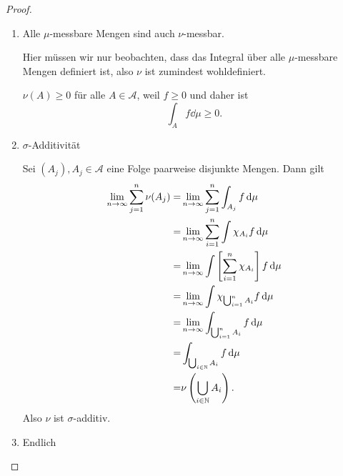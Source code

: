 \begin{proof}
	\begin{parts}
	\item 
		\begin{enumerate}[label=(\roman*)]
			\item Alle $\mu$-messbare Mengen sind auch $\nu$-messbar.

			Hier müssen wir nur beobachten, dass das Integral über alle $\mu$-messbare Mengen definiert ist, also $\nu$ ist zumindest wohldefiniert.

			$\nu(A)\ge 0$ f\"{u}r alle $A\in \mathcal{A}$, weil $f\ge 0$ und daher ist
			\[
				\int_A f\dd{\mu}\ge 0
			.\] 
		\item $\sigma$-Additivität

			Sei $(A_j), A_j\in \mathcal{A}$ eine Folge paarweise disjunkte Mengen. Dann gilt
			\begin{align*}
				\lim_{n \to \infty} \sum_{j=1}^{n} \nu(A_j)=&\lim_{n \to \infty} \sum_{j=1}^{n} \int_{A_j}f\dd{\mu}\\
				=&\lim_{n \to \infty} \sum_{i=1}^{n} \int \chi_{A_i}f\dd{\mu}\\
				=&\lim_{n \to \infty} \int\left[ \sum_{i=1}^{n} \chi_{A_i} \right] f\dd{\mu}\\
				=&\lim_{n \to \infty} \int \chi_{\bigcup_{i=1}^n A_i}f\dd{\mu}\\
				=&\lim_{n \to \infty} \int_{\bigcup_{i=1}^n A_i}f\dd{\mu}\\
				=&\int_{\bigcup_{i\in \mathbb{N}} A_i} f\dd{\mu}\\
				=&\nu\left( \bigcup_{i\in \mathbb{N}} A_i \right).
			\end{align*}
			Also $\nu$ ist $\sigma$-additiv.
		\item Endlich


\end{enumerate}
\end{parts}
\end{proof}

